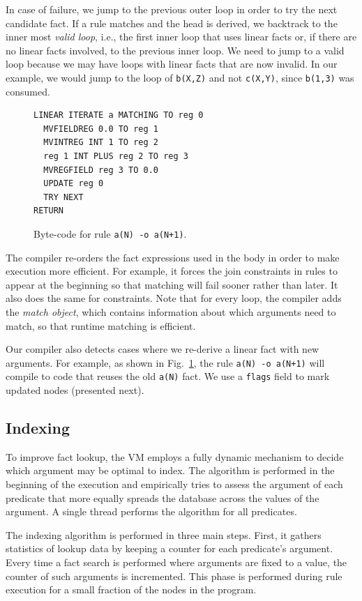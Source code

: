 In case of failure, we jump to the previous outer loop in order to try the next candidate fact.
If a rule matches and the head is derived, we backtrack to the inner most \emph{valid loop}, i.e.,
the first inner loop that uses linear facts or, if there are no linear facts involved, to the previous 
inner loop. We need to jump to a valid loop because we may have loops with linear facts that are now invalid.
In our example, we would jump to the
loop of \texttt{b(X,Z)} and not \texttt{c(X,Y)}, since \texttt{b(1,3)} was consumed.

\begin{figure}[]
\scriptsize\begin{Verbatim}
LINEAR ITERATE a MATCHING TO reg 0
  MVFIELDREG 0.0 TO reg 1
  MVINTREG INT 1 TO reg 2
  reg 1 INT PLUS reg 2 TO reg 3
  MVREGFIELD reg 3 TO 0.0
  UPDATE reg 0
  TRY NEXT
RETURN
\end{Verbatim}
\caption{\small{Byte-code for rule \texttt{a(N) -o a(N+1)}.}}
\label{code:update}
\end{figure}

The compiler re-orders the fact expressions used in the body in order to make execution more
efficient. For example, it forces the join constraints in rules to appear at the beginning so
that matching will fail sooner rather than later. It also does the same for constraints.
Note that for every loop, the compiler adds the \emph{match object}, which contains information
about which arguments need to match, so that runtime matching is efficient.

Our compiler also detects cases where we re-derive a linear fact with new arguments.
For example, as shown in Fig.~\ref{code:update}, the rule \texttt{a(N) -o a(N+1)}
will compile to code that reuses the old \texttt{a(N)} fact.
We use a \texttt{flags} field to mark updated nodes (presented next).

\subsection{Indexing}\label{indexing}

To improve fact lookup,
the VM employs a fully dynamic mechanism to decide which argument may be optimal to index.
The algorithm is performed in the beginning of the execution and empirically tries to assess the argument
of each predicate that more equally spreads the database across the values of the argument.
A single thread performs the algorithm for all predicates.

The indexing algorithm is performed in three main steps. First, it gathers statistics of lookup data by keeping a counter
for each predicate's argument.
Every time a fact search is performed where arguments are fixed to a value, the counter of such arguments is incremented. This phase is performed during rule execution for a small fraction of the nodes in the program.

